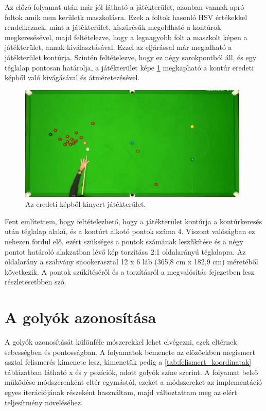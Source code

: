 \par Az előző folyamat után már jól látható a játékterület, azonban vannak apró foltok amik nem kerületk maszkolásra. Ezek a foltok hasonló HSV értékekkel rendelkeznek, mint a játékterület, kiszűrésük megoldható a kontúrok megkeresésével, majd feltételezve, hogy a legnagyobb folt a maszkolt képen a játékterület, annak kiválasztásával. Ezzel az eljárással már megadható a játékterület kontúrja. Szintén feltételezve, hogy ez négy sarokpontból áll, és egy téglalap pontosan határolja, a játékterület képe \ref{fig:bemeneti_asztal2} megkapható a kontúr eredeti képből való kivágásával és átméretezésével.

\begin{figure}[!ht]
    \centering
    \includegraphics[width=110mm, keepaspectratio]{figures/input_table.png}
    \caption{Az eredeti képből kinyert játékterület.}
    \label{fig:bemeneti_asztal2}
\end{figure}

\par Fent említettem, hogy feltételezhető, hogy a játékterület kontúrja a kontúrkeresés után téglalap alakú, és a kontúrt alkotó pontok száma 4. Viszont valóságban ez nehezen fordul elő, ezért szükséges a pontok számának leszűkítése és a négy pontot határoló alakzatban lévő kép torzítása 2:1 oldalarányú téglalapra. Az oldalarány a szabvány snookerasztal 12 x 6 láb (365,8 cm x 182,9 cm)\cite{snooker_rules} méretéből következik. A pontok szűkítéséről és a torzításról a megvalósítás fejezetben lesz részletesetbben szó.

\section{A golyók azonosítása}
A golyók azonosítását különféle mószerekkel lehet elvégezni, ezek eltérnek sebességben és pontosságban. A folyamatok bemenete az előzőekben megismert asztal felismerés kimenete lesz, kimenetük pedig a \ref{tab:felismert_koordinatak} táblázatban látható x és y pozíciók, adott golyók színe szerint. A folyamat belső működése módszerenként eltér egymástól, ezeket a módszereket az implementáció egyes iterációjának részeként használtam, majd változtattam meg az elért teljesítmény növeléséhez.

